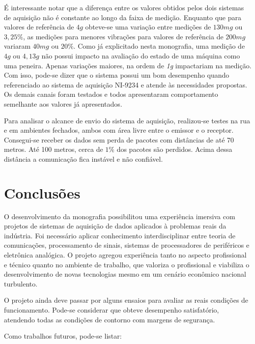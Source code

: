 \documentclass[
	12pt,				%
	openright,			%
	twoside,			%
	a4paper,			%
	english,			%
	french,				%
	spanish,			%
	brazil,				%
	]{abntex2}
\begin{document}
		É interessante notar que a diferença entre os valores obtidos pelos dois sistemas de aquisição não é constante ao longo da faixa de medição. Enquanto que para valores de referência de $4g$ obteve-se uma variação entre medições de $130mg$ ou $3,25\%$, as medições para menores vibrações para valores de referência de $200mg$ variaram $40mg$ ou $20\%$. Como já explicitado nesta monografia, uma medição de $4g$ ou $4,13g$ não possui impacto na avaliação do estado de uma máquina como uma peneira. Apenas variações maiores, na ordem de \textit{1g} impactariam na medição. Com isso, pode-se dizer que o sistema possui um bom desempenho quando referenciado ao sistema de aquisição NI-9234 e atende às necessidades propostas. Os demais canais foram testados e todos apresentaram comportamento semelhante aos valores já apresentados.

		Para analisar o alcance de envio do sistema de aquisição, realizou-se testes na rua e em ambientes fechados, ambos com área livre entre o emissor e o receptor. Consegui-se receber os dados sem perda de pacotes com distâncias de até 70 metros. Até 100 metros, cerca de $1\%$ dos pacotes são perdidos. Acima dessa distância a comunicação fica instável e não confiável.


\chapter{Conclusões}

	O desenvolvimento da monografia possibilitou uma experiência imersiva com
	projetos de sistemas de aquisição de dados aplicados à problemas
	reais da indústria. Foi necessário aplicar conhecimento
	interdisciplinar entre teoria de comunicações, processamento de
	sinais, sistemas de processadores de periféricos e eletrônica
	analógica. O projeto agregou experiência tanto no aspecto
	profissional e técnico quanto no ambiente de trabalho, que valoriza
	o profissional e viabiliza o desenvolvimento de novas tecnologias
	mesmo em um cenário econômico nacional turbulento.

	O projeto ainda deve passar por alguns ensaios para avaliar as reais
	condições de funcionamento. Pode-se considerar que obteve desempenho satisfatório, atendendo
	todas as condições de contorno com margens de segurança.
	
	Como trabalhos futuros, pode-se listar:
	
\end{document}
